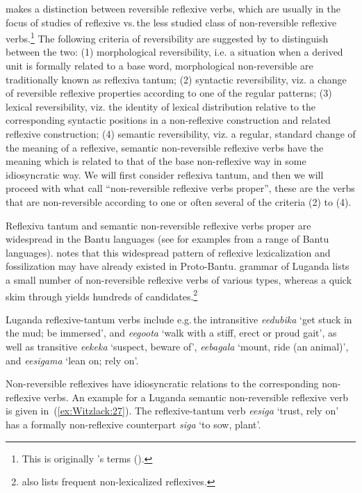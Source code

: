 \documentclass[output=paper,colorlinks,citecolor=brown,
]{langscibook}
\begin{document}
\citet[31]{Geniusiene1987} makes a distinction between reversible reflexive verbs, which are usually in the focus of studies of reflexive vs.\,the less studied class of non-reversible  reflexive verbs.\footnote{This is originally \citeauthor{Nedjalkov1997}'s terms (\citeyear[10–15]{Nedjalkov1997}).} 
The following criteria of reversibility are suggested by \citet[145–148]{Geniusiene1987} to distinguish between the two: (1) morphological reversibility, i.e. a situation when a derived unit is formally related to a base word, morphological non-reversible are traditionally known as reflexiva tantum; (2) syntactic reversibility, viz. a change of reversible reflexive properties according to one of the regular patterns; (3) lexical reversibility, viz. the identity of lexical distribution relative to the corresponding syntactic positions in a non-reflexive construction and related reflexive construction; (4) semantic reversibility, viz. a regular, standard change of the meaning of a reflexive, semantic non-reversible reflexive verbs have the meaning which is related to that of the base non-reflexive way in some idiosyncratic way. We will first consider reflexiva tantum, and then we will proceed with what \citet{GotoSay2009} call “non-reversible reflexive verbs proper”, these are the verbs that are non-reversible according to one or often several of the criteria (2) to (4).

Reflexiva tantum and semantic non-reversible reflexive verbs proper are wide\-spread in the Bantu languages (see \citealt{Marlo2015-1} for examples from a range of Bantu languages). 
\citet{Polak1983} notes that this widespread pattern of reflexive lexicalization and fossilization may have already existed in Proto-Bantu. 
\citet[132–133]{AshtonEtAl1954} grammar of Luganda lists a small number of non-reversible reflexive verbs of various types, whereas a quick skim through \citet{Murphy1972} yields hundreds of candidates.\footnote{\citet{Murphy1972} also lists frequent non-lexicalized reflexives.}

Luganda reflexive-tantum verbs include e.g.\,the intransitive \emph{eedubika} ‘get stuck in the mud; be immersed’, and \emph{eegoota} ‘walk with a stiff, erect or proud gait’, as well as transitive \emph{eekeka} ‘suspect, beware of’, \emph{eebagala} ‘mount, ride (an animal)’, and \emph{eesigama} ‘lean on; rely on’. 

Non-reversible reflexives have idiosyncratic relations to the corresponding non-reflexive verbs. An example for a Luganda semantic non-reversible reflexive verb is given in~(\ref{ex:Witzlack:27}).
The reflexive-tantum verb \emph{eesiga} ‘trust, rely on’ has a formally non-reflexive counterpart \emph{siga} ‘to sow, plant’.
\end{document}
